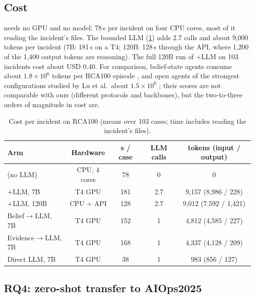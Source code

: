 \subsection{Cost}\label{sec:cost}
\core{} needs no GPU and no model: 78\,s per incident on four CPU cores, most of it reading the incident's files. The bounded LLM
(\cref{tab:cost}) adds 2.7 calls and about 9,000 tokens per incident (7B: 181\,s on a T4; 120B: 128\,s through the API, where 1,200 of the 1,400 output
tokens are reasoning). The full 120B run of \core{}+LLM on 103 incidents cost about USD 0.40. For comparison, belief-state agents
consume about $1.8\times10^6$ tokens per RCA100 episode \citep{luo2026pos}, and open agents of the strongest configurations studied
by Lu et al.\ about $1.5\times10^6$ \citep{lu2026beyond}; their scores are not comparable with ours (different protocols and
backbones), but the two-to-three orders of magnitude in cost are.

\begin{table}[!htbp]
\centering
\caption{Cost per incident on RCA100 (means over 103 cases; time includes reading the incident's files).}\label{tab:cost}
\footnotesize
\begin{tabular}{@{}lcccc@{}}
\toprule
Arm & Hardware & s / case & LLM calls & tokens (input / output) \\
\midrule
\core{} (no LLM) & CPU, 4 cores & 78 & 0 & 0 \\
\core{}+LLM, 7B & T4 GPU & 181 & 2.7 & 9{,}157 (8{,}986 / 228) \\
\core{}+LLM, 120B & CPU + API & 128 & 2.7 & 9{,}012 (7{,}592 / 1{,}421) \\
Belief$\rightarrow$LLM, 7B & T4 GPU & 152 & 1 & 4{,}812 (4{,}585 / 227) \\
Evidence$\rightarrow$LLM, 7B & T4 GPU & 168 & 1 & 4{,}337 (4{,}128 / 209) \\
Direct LLM, 7B & T4 GPU & 38 & 1 & 983 (856 / 127) \\
\bottomrule
\end{tabular}
\end{table}

\subsection{RQ4: zero-shot transfer to AIOps2025}\label{sec:aiops}

